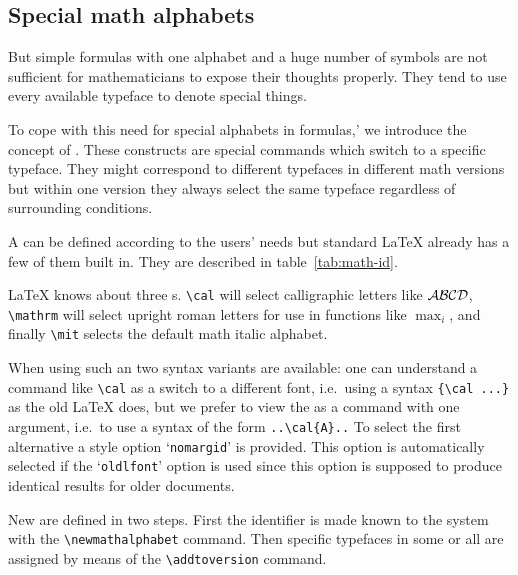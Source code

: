  \subsection{Special math alphabets}

 But simple formulas with one alphabet and a huge number of symbols
 are not sufficient for mathematicians to expose their thoughts
 properly.  They tend to use every available typeface to denote
 special things.

 To cope with this need for special alphabets in formulas,' we introduce
 the concept of .  These constructs are
 special commands which switch to a specific typeface.  They might
 correspond to different typefaces in different math versions but
 within one version they always select the same typeface regardless of
 surrounding conditions.

 A  can be defined according to
 the users' needs but standard \LaTeX{} already has a few of them built
 in. They are described in table~\ref{tab:math-id}.
\begin{table*}
 \rightskip\leftskip
  \LaTeX{} knows about three s.  \verb=\cal= will select calligraphic
  letters like $\cal A \cal B \cal C \cal D$,
  \verb=\mathrm= will select upright roman letters for
  use in functions like $\max_i$, and finally
  \verb=\mit= selects the default math italic alphabet.
\caption{Predefined  in \LaTeX}
\label{tab:math-id}
\end{table*}

 When using such an  two
 syntax variants are available:  one can understand a
 command like \verb+\cal+ as a switch to a different
 font, i.e.\ using a syntax \verb+{\cal ...}+ as the
 old \LaTeX{} does, but we prefer to view the
   as a command with one
 argument, i.e.\ to use a syntax of the form
 \verb+..\cal{A}..+ To select the first alternative a
 style option `{\tt nomargid}' is provided.  This option
 is automatically selected if the `{\tt oldlfont}' option
 is used since this option is supposed to produce
 identical results for older documents.

 New  are defined in
 two steps. First the identifier is made known to the
 system with the \verb+\newmathalphabet+ command. Then
 specific typefaces in some or all 
 are assigned by means of the \verb+\addtoversion+
 command.

